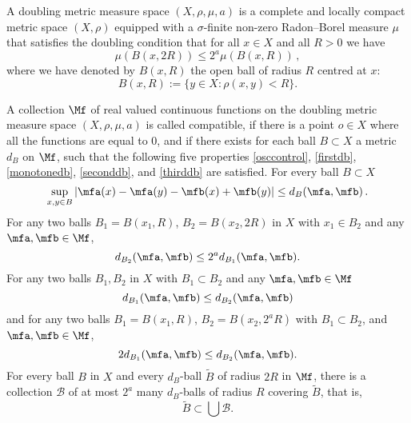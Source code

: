 A doubling metric measure space $(X,\rho,\mu, a)$ is a complete
and locally compact metric space $(X,\rho)$
equipped with a $\sigma$-finite non-zero Radon--Borel measure $\mu$ that satisfies the doubling condition that for all $x\in X$ and all $R>0$ we have
\begin{equation}\label{doublingx}
    \mu(B(x,2R))\le 2^a\mu(B(x,R))\,,
\end{equation}
where we have denoted by $B(x,R)$ the open ball of radius $R$ centred at $x$:
\begin{equation}\label{eq-define-ball}
 B(x,R):=\{y\in X: \rho(x,y)<R\}. \end{equation}

A collection $\Mf$ of real valued continuous functions on the doubling metric measure space $(X,\rho,\mu,a)$ is called compatible, if there is a point $o\in X$ where all the functions are equal to $0$, and if there exists for each ball $B \subset X$ a metric $d_B$ on $\Mf$, such that the following five properties \eqref{osccontrol}, \eqref{firstdb}, \eqref{monotonedb}, \eqref{seconddb}, and \eqref{thirddb} are satisfied. For every ball $B \subset X$
\begin{equation}\label{osccontrol}
    \sup_{x,y\in B}|\mfa(x)-{\mfa(y)}- \mfb(x)+{\mfb(y)}| \le d_{B}(\mfa,\mfb)\,.
\end{equation}
For any two balls $B_1=B(x_1,R)$, $B_2= B(x_2,2R)$ in $X$ with $x_1\in B_2$ and any $\mfa,\mfb\in \Mf$,
\begin{equation}\label{firstdb}
    d_{B_2}(\mfa,\mfb)\le 2^a d_{B_1}(\mfa,\mfb) .
\end{equation}
For any two balls $B_1, B_2$ in $X$ with $B_1 \subset B_2$ and any $\mfa, \mfb \in \Mf$
\begin{equation}\label{monotonedb}
    d_{B_1}(\mfa,\mfb) \le d_{B_2}(\mfa, \mfb)
\end{equation}
and for any two balls
$B_1=B(x_1,R)$, $B_2= B(x_2,2^aR)$
with $B_1\subset B_2$, and $\mfa,\mfb\in \Mf$,
\begin{equation}\label{seconddb}
    2d_{B_1}(\mfa,\mfb)
\le d_{B_2}(\mfa,\mfb) .
\end{equation}
For every ball $B$ in $X$ and every $d_B$-ball $\tilde B$ of radius $2R$ in $\Mf$, there is a collection $\mathcal{B}$ of
at most $2^a$ many $d_B$-balls of radius $R$ covering $\tilde B$, that is,
\begin{equation}\label{thirddb}
    \tilde B\subset \bigcup \mathcal{B}.
\end{equation}


